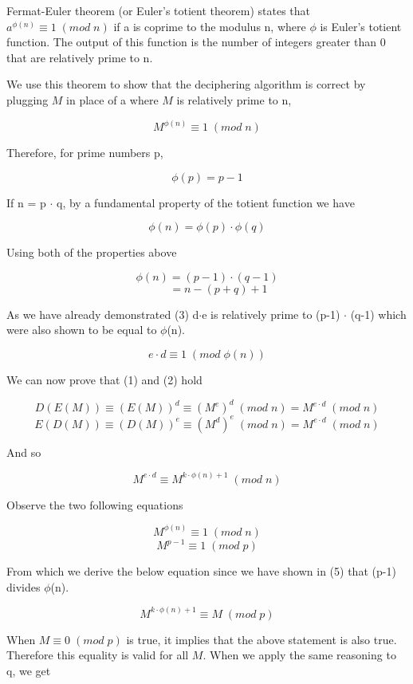 \documentclass[12pt, letterpaper]{article}
\begin{document}
Fermat-Euler theorem (or Euler’s totient theorem) states that $a^{\phi(n)} \equiv 1 \; (mod \; n)$ if a is coprime to the modulus n, where $\phi$ is Euler's totient function. The output of this function is the number of integers greater than 0 that are relatively prime to n.

We use this theorem to show that the deciphering algorithm is correct by plugging $M$ in place of a where $M$ is relatively prime to n,

\begin{equation}
M^{\phi(n)} \equiv 1 \; (mod \; n)
\end{equation}

Therefore, for prime numbers p, 

\[ \phi(p) = p - 1 \]
	
If n = p $\cdot$ q, by a fundamental property of the totient function we have

\[ \phi(n) = \phi(p) \cdot \phi(q) \]

Using both of the properties above

\[ \phi(n) = (p - 1) \cdot (q - 1) \]
\begin{equation}
\qquad = n - (p + q) + 1
\end{equation}

As we have already demonstrated (3) d$\cdot$e is relatively prime to (p-1) $\cdot$ (q-1) which were also shown to be equal to $\phi$(n).

\[ e \cdot d \equiv 1 \; (mod \; \phi(n)) \]

We can now prove that (1) and (2) hold

\[ D(E(M)) \equiv (E(M))^d \equiv (M^e)^d \; (mod \; n) = M^{e \cdot d} \; (mod \; n) \]
\[ E(D(M)) \equiv (D(M))^e \equiv (M^d)^e \; (mod \; n) = M^{e \cdot d} \; (mod \; n) \]

And so

\[ M^{e \cdot d} \equiv M^{k \cdot \phi(n)+1} \; (mod \; n) \]

Observe the two following equations

\[ M^{\phi(n)} \equiv 1 \; (mod \; n) \]
\[ M^{p-1}  \equiv 1 \; (mod \; p) \]

From which we derive the below equation since we have shown in (5) that (p-1) divides $\phi$(n).

\[ M^{k \cdot \phi(n)+1} \equiv M \; (mod \; p)\]

When $M \equiv 0 \; (mod \; p)$ is true, it implies that the above statement is also true. Therefore this equality is valid for all $M$. When we apply the same reasoning to q, we get
\end{document}
